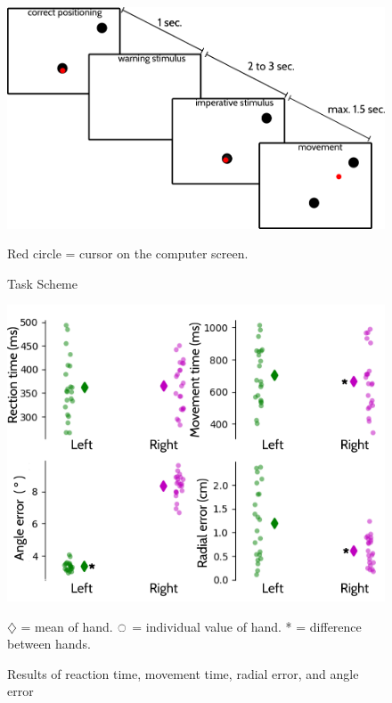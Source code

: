 \documentclass[man,a4paper,12pt,floatsintext]{apa6}
\begin{document}
\begin{figure}[p] %
\includegraphics[width=\linewidth]{figures/f3.png}
\caption{Task Scheme}{Red circle = cursor on the computer screen.}
\label{fig3}
\end{figure}


\begin{figure}[p] %
\includegraphics[width=\linewidth]{figures/f4.png}
\caption{Results of reaction time, movement time, radial error, and angle error}{$\diamondsuit$ = mean of hand. $\ocircle$ = individual value of hand. * = difference between hands.}
\label{fig4}
\end{figure}
\end{document}
